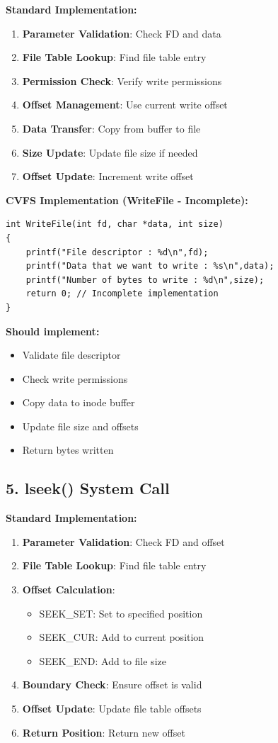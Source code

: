 \documentclass[11pt,a4paper]{article}
\begin{document}
\textbf{Standard Implementation:}
\begin{enumerate}
    \item \textbf{Parameter Validation}: Check FD and data
    \item \textbf{File Table Lookup}: Find file table entry
    \item \textbf{Permission Check}: Verify write permissions
    \item \textbf{Offset Management}: Use current write offset
    \item \textbf{Data Transfer}: Copy from buffer to file
    \item \textbf{Size Update}: Update file size if needed
    \item \textbf{Offset Update}: Increment write offset
\end{enumerate}

\textbf{CVFS Implementation (WriteFile - Incomplete):}
\begin{lstlisting}
int WriteFile(int fd, char *data, int size)
{
    printf("File descriptor : %d\n",fd);
    printf("Data that we want to write : %s\n",data);
    printf("Number of bytes to write : %d\n",size);
    return 0; // Incomplete implementation
}
\end{lstlisting}

\textbf{Should implement:}
\begin{itemize}
    \item Validate file descriptor
    \item Check write permissions
    \item Copy data to inode buffer
    \item Update file size and offsets
    \item Return bytes written
\end{itemize}

\subsection{5. lseek() System Call}

\textbf{Standard Implementation:}
\begin{enumerate}
    \item \textbf{Parameter Validation}: Check FD and offset
    \item \textbf{File Table Lookup}: Find file table entry
    \item \textbf{Offset Calculation}: 
    \begin{itemize}
        \item SEEK\_SET: Set to specified position
        \item SEEK\_CUR: Add to current position
        \item SEEK\_END: Add to file size
    \end{itemize}
    \item \textbf{Boundary Check}: Ensure offset is valid
    \item \textbf{Offset Update}: Update file table offsets
    \item \textbf{Return Position}: Return new offset
\end{enumerate}
\end{document}
